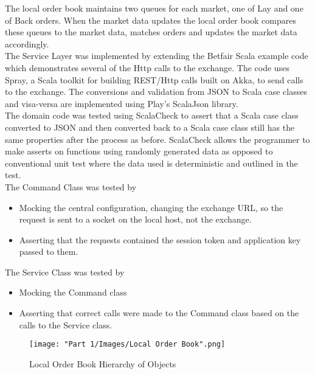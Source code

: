 		The local order book maintains two queues for each market, one of Lay and one of Back orders. When the market data updates the local order book compares these queues to the market data, matches orders and updates the market data accordingly.\\
		
		The Service Layer was implemented by extending the Betfair Scala example code\cite{BetfairScalaSample} which demonstrates several of the Http calls to the exchange. The code uses Spray\cite{Spray}, a Scala toolkit for building REST/Http calls built on Akka, to send calls to the exchange. The conversions and validation from JSON to Scala case classes and visa-versa are implemented using Play's ScalaJson library\cite{PlayJSON}.\\
		
		The domain code was tested using ScalaCheck to assert that a Scala case class converted to JSON and then converted back to a Scala case class still has the same properties after the process as before. ScalaCheck allows the programmer to make asserts on functions using randomly generated data as opposed to conventional unit test where the data used is deterministic and outlined in the test.\\
		
		The Command Class was tested by
			\begin{itemize}
				\item Mocking the central configuration, changing the exchange URL, so the request is sent to a socket on the local host, not the exchange.
				\item Asserting that the requests contained the session token and application key passed to them.
			\end{itemize} 
		
		The Service Class was tested by
			\begin{itemize}
				\item Mocking the Command class
				\item Asserting that correct calls were made to the Command class based on the calls to the Service class.
			\end{itemize}
			
		\begin{figure}[H]
			\centering		
			\texttt{[image: "Part 1/Images/Local Order Book".png]}
			\caption{Local Order Book Hierarchy of Objects}
			\label{fig:localOrderBook}
		\end{figure}
			
